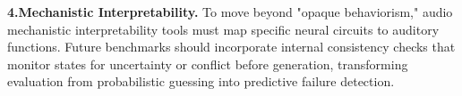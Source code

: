 \textbf{4.Mechanistic Interpretability.} To move beyond "opaque behaviorism," audio mechanistic interpretability tools must map specific neural circuits to auditory functions. Future benchmarks should incorporate internal consistency checks that monitor states for uncertainty or conflict before generation, transforming evaluation from probabilistic guessing into predictive failure detection.


